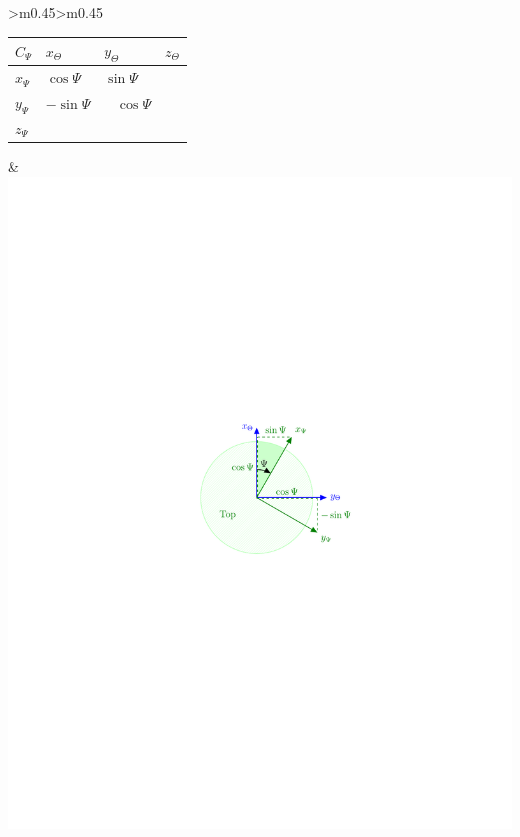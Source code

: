 \documentclass[12pt]{ucthesis}
\begin{document}
\begin{table}[!ht]
\begin{tabular}{>{\centering\arraybackslash}m{}>{\centering\arraybackslash}m{}}
\begin{tabular}{>{\centering\arraybackslash}m{.25in}|>{\centering\arraybackslash}m{.5in}>{\centering\arraybackslash}m{.5in}>{\centering\arraybackslash}m{.5in}}
		$C_{\Psi}$ & $x_{\Theta}$ & $y_{\Theta}$ & $z_{\Theta}$\\ 
		\hline
		$x_{\Psi}$ & $\cos\Psi$ & $\sin\Psi$ & 0 \\
		$y_{\Psi}$ & $-\sin\Psi$ & $\;\;\;\cos\Psi$ & 0 \\
		$z_{\Psi}$ & 0 & 0 & 1 \\
		\end{tabular}
	& 
		\includegraphics[clip=true, viewport=2in 4.625in 6in 6.875in, scale=.75]{figs/fig_dcm_2D_3.pdf}
	\\
	\bottomrule
    \end{tabular}%
    \label{tab: dcm_plane_rot}
\end{table}%
%
\end{document}
